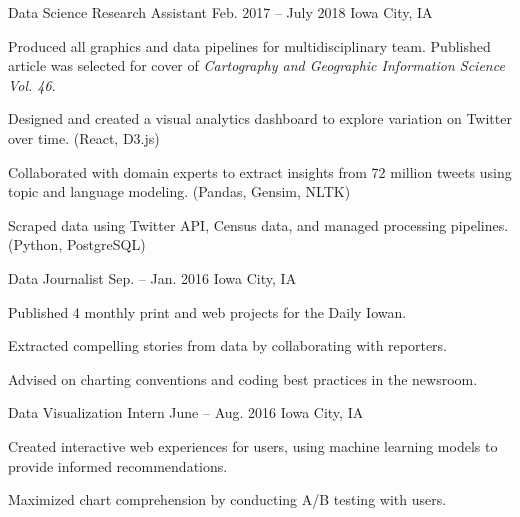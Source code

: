 \begin{cventries}
    {Data Science Research Assistant}
    {Feb. 2017 -- July 2018}
    {Iowa City, IA}
    {%
      \begin{cvitems}
        \item {Produced all graphics and data pipelines for multidisciplinary team. Published article was selected for cover of \textit{Cartography and Geographic Information Science Vol. 46}.}
        \item {Designed and created a visual analytics dashboard to explore variation on Twitter over time. (React, D3.js)}
        \item {Collaborated with domain experts to extract insights from 72 million tweets using topic and language modeling. (Pandas, Gensim, NLTK)}
        \item{Scraped data using Twitter API, Census data, and managed processing pipelines. (Python, PostgreSQL)}
      \end{cvitems}
    }

    {Data Journalist}
    {Sep. -- Jan. 2016}
    {Iowa City, IA}
    {%
      \begin{cvitems}
        \item{Published 4 monthly print and web projects for the Daily Iowan.}
        \item{Extracted compelling stories from data by collaborating with reporters.}
        \item{Advised on charting conventions and coding best practices in the newsroom.}
      \end{cvitems}
    }

    {Data Visualization Intern}
    {June -- Aug. 2016}
    {Iowa City, IA}
    {%
      \begin{cvitems}
        \item{Created interactive web experiences for users, using machine learning models to provide informed recommendations.}
        \item{Maximized chart comprehension by conducting A/B testing with users.}
      \end{cvitems}
    }
\end{cventries}
